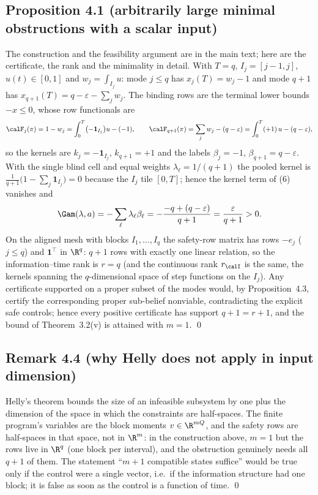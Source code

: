 \subsection{Proposition 4.1 (arbitrarily large minimal obstructions with a scalar input)}
The construction and the feasibility argument are in the main text; here are the certificate, the rank and the minimality in detail. With $T=q$, $I_j=[j-1,j]$, $u(t)\in[0,1]$ and $w_j=\int_{I_j}u$: mode $j\le q$ has $x_j(T)=w_j-1$ and mode $q+1$ has $x_{q+1}(T)=q-\varepsilon-\sum_jw_j$. The binding rows are the terminal lower bounds $-x\le0$, whose row functionals are
\[
\calF_j(\pi)=1-w_j=\int_0^T\bigl(-\mathbf 1_{I_j}\bigr)u-(-1),\qquad
\calF_{q+1}(\pi)=\sum_jw_j-(q-\varepsilon)=\int_0^T(+1)\,u-(q-\varepsilon),
\]
so the kernels are $k_j=-\mathbf 1_{I_j}$, $k_{q+1}=+1$ and the labels $\beta_j=-1$, $\beta_{q+1}=q-\varepsilon$. With the single blind cell and equal weights $\lambda_\ell=1/(q+1)$ the pooled kernel is $\frac1{q+1}\bigl(1-\sum_j\mathbf 1_{I_j}\bigr)=0$ because the $I_j$ tile $[0,T]$; hence the kernel term of (6) vanishes and
\[
\Gam(\lambda,a)=-\sum_\ell\lambda_\ell\beta_\ell=-\frac{-q+(q-\varepsilon)}{q+1}=\frac{\varepsilon}{q+1}>0 .
\]
On the aligned mesh with blocks $I_1,\dots,I_q$ the safety-row matrix has rows $-e_j$ ($j\le q$) and $\mathbf 1^\top$ in $\R^q$: $q+1$ rows with exactly one linear relation, so the information--time rank is $r=q$ (and the continuous rank $r_\calI$ is the same, the kernels spanning the $q$-dimensional space of step functions on the $I_j$). Any certificate supported on a proper subset of the modes would, by Proposition~4.3, certify the corresponding proper sub-belief nonviable, contradicting the explicit safe controls; hence every positive certificate has support $q+1=r+1$, and the bound of Theorem~3.2(v) is attained with $m=1$. \qed

\subsection{Remark 4.4 (why Helly does not apply in input dimension)}
Helly's theorem bounds the size of an infeasible subsystem by one plus the dimension of the space in which the constraints are half-spaces. The finite program's variables are the block moments $v\in\R^{mQ}$, and the safety rows are half-spaces in that space, not in $\R^m$: in the construction above, $m=1$ but the rows live in $\R^{q}$ (one block per interval), and the obstruction genuinely needs all $q+1$ of them. The statement ``$m+1$ compatible states suffice'' would be true only if the control were a single vector, i.e.\ if the information structure had one block; it is false as soon as the control is a function of time. \qed
